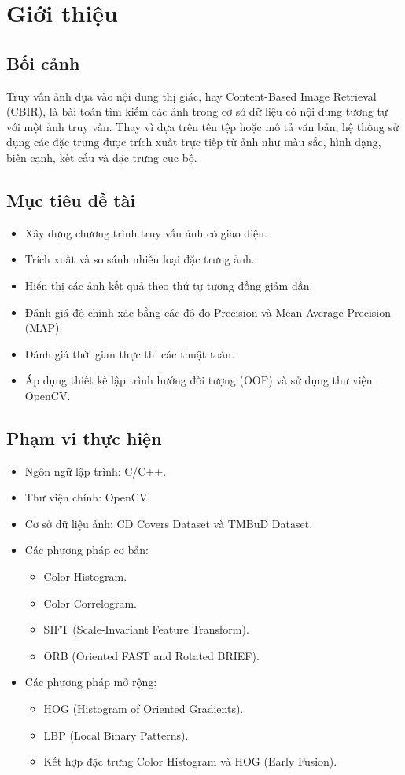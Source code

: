 \chapter{Giới thiệu}

\section{Bối cảnh}
Truy vấn ảnh dựa vào nội dung thị giác, hay Content-Based Image Retrieval (CBIR), là bài toán tìm kiếm các ảnh trong cơ sở dữ liệu có nội dung tương tự với một ảnh truy vấn. Thay vì dựa trên tên tệp hoặc mô tả văn bản, hệ thống sử dụng các đặc trưng được trích xuất trực tiếp từ ảnh như màu sắc, hình dạng, biên cạnh, kết cấu và đặc trưng cục bộ.

\section{Mục tiêu đề tài}
\begin{itemize}
    \item Xây dựng chương trình truy vấn ảnh có giao diện.
    \item Trích xuất và so sánh nhiều loại đặc trưng ảnh.
    \item Hiển thị các ảnh kết quả theo thứ tự tương đồng giảm dần.
    \item Đánh giá độ chính xác bằng các độ đo Precision và Mean Average Precision (MAP).
    \item Đánh giá thời gian thực thi các thuật toán.
    \item Áp dụng thiết kế lập trình hướng đối tượng (OOP) và sử dụng thư viện OpenCV.
\end{itemize}

\section{Phạm vi thực hiện}
\begin{itemize}
    \item Ngôn ngữ lập trình: C/C++.
    \item Thư viện chính: OpenCV.
    \item Cơ sở dữ liệu ảnh: CD Covers Dataset và TMBuD Dataset.
    \item Các phương pháp cơ bản:
    \begin{itemize}
        \item Color Histogram.
        \item Color Correlogram.
        \item SIFT (Scale-Invariant Feature Transform).
        \item ORB (Oriented FAST and Rotated BRIEF).
    \end{itemize}
    \item Các phương pháp mở rộng:
    \begin{itemize}
        \item HOG (Histogram of Oriented Gradients).
        \item LBP (Local Binary Patterns).
        \item Kết hợp đặc trưng Color Histogram và HOG (Early Fusion).
    \end{itemize}
\end{itemize}


